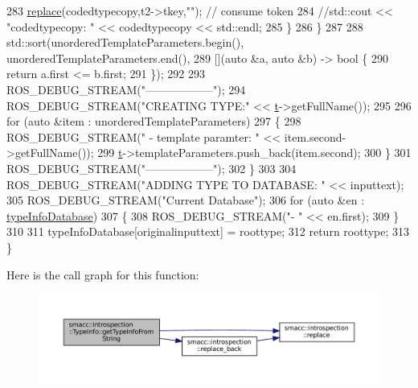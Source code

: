 \begin{DoxyCode}
283                 \hyperlink{namespacesmacc_1_1introspection_a48571b9bf3b115d2a83cc0147c96d0bd}{replace}(codedtypecopy,t2->tkey,\textcolor{stringliteral}{""}); \textcolor{comment}{// consume token}
284                 \textcolor{comment}{//std::cout << "codedtypecopy: " << codedtypecopy << std::endl;}
285             \}
286         \}
287 
288         std::sort(unorderedTemplateParameters.begin(), unorderedTemplateParameters.end(),
289                   [](\textcolor{keyword}{auto} &a, \textcolor{keyword}{auto} &b) -> \textcolor{keywordtype}{bool} \{
290                       \textcolor{keywordflow}{return} a.first <= b.first;
291                   \});
292 
293         ROS\_DEBUG\_STREAM(\textcolor{stringliteral}{"------------------"});
294         ROS\_DEBUG\_STREAM(\textcolor{stringliteral}{"CREATING TYPE:"} << \hyperlink{namespacebattery__monitor__node_a7a63d20d1ea461e280f4eb5b47f925cd}{t}->getFullName());
295 
296         \textcolor{keywordflow}{for} (\textcolor{keyword}{auto} &item : unorderedTemplateParameters)
297         \{
298             ROS\_DEBUG\_STREAM(\textcolor{stringliteral}{" - template paramter: "} << item.second->getFullName());
299             \hyperlink{namespacebattery__monitor__node_a7a63d20d1ea461e280f4eb5b47f925cd}{t}->templateParameters.push\_back(item.second);
300         \}
301         ROS\_DEBUG\_STREAM(\textcolor{stringliteral}{"------------------"});
302     \}
303 
304     ROS\_DEBUG\_STREAM(\textcolor{stringliteral}{"ADDING TYPE TO DATABASE: "} << inputtext);
305     ROS\_DEBUG\_STREAM(\textcolor{stringliteral}{"Current Database"});
306     \textcolor{keywordflow}{for} (\textcolor{keyword}{auto} &en : \hyperlink{classsmacc_1_1introspection_1_1TypeInfo_ab780c03206b824aaf338135d16b0eff4}{typeInfoDatabase})
307     \{
308         ROS\_DEBUG\_STREAM(\textcolor{stringliteral}{"- "} << en.first);
309     \}
310 
311     typeInfoDatabase[originalinputtext] = roottype;
312     \textcolor{keywordflow}{return} roottype;
313 \}
\end{DoxyCode}
Here is the call graph for this function\+:
\nopagebreak
\begin{figure}[H]
\begin{center}
\leavevmode
\includegraphics[width=350pt]{classsmacc_1_1introspection_1_1TypeInfo_a47d65b6c61499d7ae8ab9f6325c84837_cgraph}
\end{center}
\end{figure}

